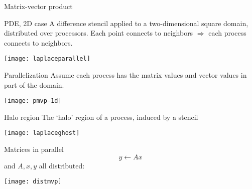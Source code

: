 \begin{comment}
  \begin{frame}{Block methods}
    \begin{itemize}
    \item GMRES does a block orthogonalization in every iteration
    \item in Conjugate Gradients:
      \begin{itemize}
      \item single orthogonalization
      \item matrix-vector product
      \end{itemize}
      (this is actually kinda modified Gram-Schmidt)
    \item $\Rightarrow$ communication minimization through block methods:\\
      compute $x,Ax,A^2x,\ldots,A^kx$, then block orthogonalize
    \item latency hiding vs numerical stability
    \end{itemize}
  \end{frame}
\end{comment}

 {Matrix-vector product}

\begin{frame}{PDE, 2D case}
    A difference stencil applied to a two-dimensional square
    domain, distributed over processors. Each point connects to
    neighbors $\Rightarrow$ each process connects to neighbors.

    \texttt{[image: laplaceparallel]}
\end{frame}

\begin{frame}{Parallelization}
  Assume each process has the matrix values and vector values in part
  of the domain.

  \texttt{[image: pmvp-1d]}

  
\end{frame}

\begin{frame}{Halo region}
  The `halo' region of a process, induced by a stencil

  \texttt{[image: laplaceghost]}
\end{frame}

\begin{frame}{Matrices in parallel}
  \[ y\leftarrow Ax\]
  and $A,x,y$ all distributed:

  \texttt{[image: distmvp]}
\end{frame}

